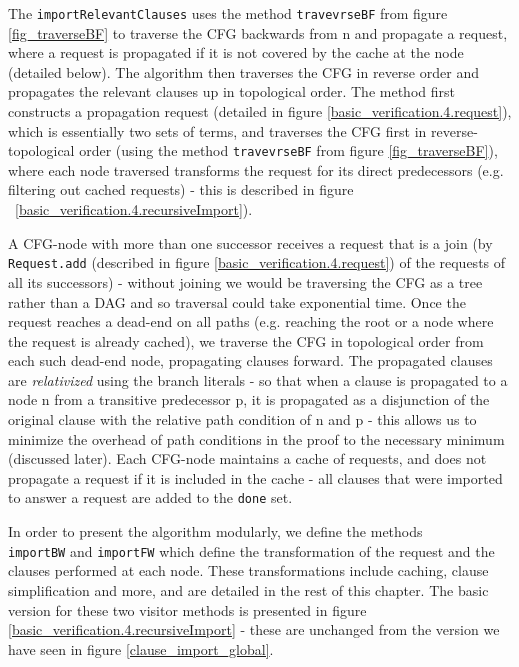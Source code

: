 The \lstinline|importRelevantClauses| uses the method \lstinline|travevrseBF| from figure \ref{fig_traverseBF} to traverse the CFG backwards from n and propagate a request, where a request is propagated if it is not covered by the cache at the node (detailed below).
The algorithm then traverses the CFG in reverse order and propagates the relevant clauses up in topological order.
The method first constructs a propagation request (detailed in figure \ref{basic_verification.4.request}), which is essentially two sets of terms, and traverses the CFG first in reverse-topological order (using the method \lstinline|travevrseBF| from figure \ref{fig_traverseBF}), where each node traversed transforms the request for its direct predecessors (e.g. filtering out cached requests) - this is described in figure ~\ref{basic_verification.4.recursiveImport}).

A CFG-node with more than one successor receives a request that is a join (by \lstinline|Request.add| (described in figure \ref{basic_verification.4.request}) of the requests of all its successors) - without joining we would be traversing the CFG as a tree rather than a DAG and so traversal could take exponential time.
Once the request reaches a dead-end on all paths (e.g. reaching the root or a node where the request is already cached), we traverse the CFG in topological order from each such dead-end node, propagating clauses forward. The propagated clauses are \emph{relativized} using the branch literals - so that when a clause is propagated to a node n from a transitive predecessor p, it is propagated as a disjunction of the original clause with the relative path condition of n and p - this allows us to minimize the overhead of path conditions in the proof to the necessary minimum (discussed later). Each CFG-node maintains a cache of requests, and does not propagate a request if it is included in the cache - all clauses that were imported to answer a request are added to the \lstinline|done| set.

In order to present the algorithm modularly, we define the methods \\
\lstinline|importBW| and \lstinline|importFW| which define the transformation of the request and the clauses performed at each node.
These transformations include caching, clause simplification and more, and are detailed in the rest of this chapter.
The basic version for these two visitor methods is presented in figure \ref{basic_verification.4.recursiveImport} - these are unchanged from the version we have seen in figure \ref{clause_import_global}.


